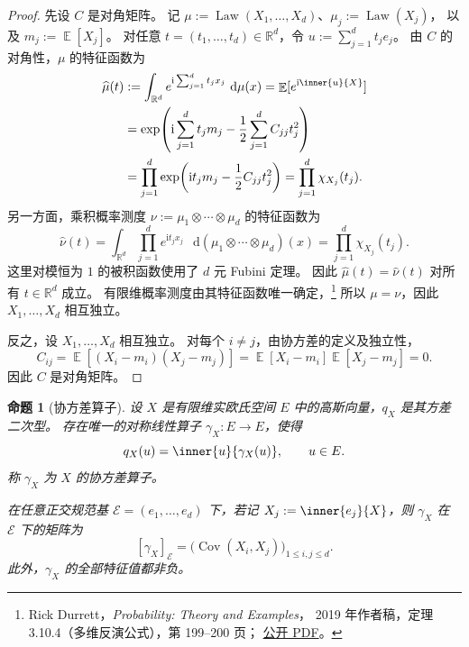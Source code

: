 \documentclass[UTF8,11pt,a4paper,oneside,fontset=fandol]{ctexrep}
\numberwithin{equation}{section}
\theoremstyle{plain}
\newtheorem{proposition}[theorem]{命题}
\theoremstyle{definition}
\theoremstyle{remark}
\newcommand{\R}{\mathbb{R}}
\DeclareMathOperator{\E}{\mathbb{E}}
\DeclareMathOperator{\Cov}{Cov}
\DeclareMathOperator{\Law}{Law}
\newcommand{\dd}{\mathop{}\!\mathrm{d}}
\begin{document}
\begin{proof}
先设 $C$ 是对角矩阵。
记 $\mu:=\Law(X_1,\ldots,X_d)$、$\mu_j:=\Law(X_j)$，
以及 $m_j:=\E[X_j]$。
对任意 $t=(t_1,\ldots,t_d)\in\R^d$，令 $u:=\sum_{j=1}^{d}t_je_j$。
由 $C$ 的对角性，$\mu$ 的特征函数为 
\begin{align*}
  \widehat\mu(t)
  &:=\int_{\R^d}e^{\mathrm{i}\sum_{j=1}^{d}t_jx_j}\,\dd\mu(x)
    =\E[e^{\mathrm{i}\inner{u}{X}}]\\
  &=\exp\!\left(
      \mathrm{i}\sum_{j=1}^{d}t_jm_j
      -\frac12\sum_{j=1}^{d}C_{jj}t_j^2
    \right)\\
  &=\prod_{j=1}^{d}
      \exp\!\left(\mathrm{i}t_jm_j-\frac12C_{jj}t_j^2\right)
    =\prod_{j=1}^{d}\chi_{X_j}(t_j).
\end{align*}
另一方面，乘积概率测度 $\nu:=\mu_1\otimes\cdots\otimes\mu_d$
的特征函数为
\[
  \widehat\nu(t)
  =\int_{\R^d}\prod_{j=1}^{d}e^{\mathrm{i}t_jx_j}\,
      \dd(\mu_1\otimes\cdots\otimes\mu_d)(x)
  =\prod_{j=1}^{d}\chi_{X_j}(t_j).
\]
这里对模恒为 $1$ 的被积函数使用了 $d$ 元 Fubini 定理。
因此 $\widehat\mu(t)=\widehat\nu(t)$ 对所有 $t\in\R^d$ 成立。
有限维概率测度由其特征函数唯一确定，\footnote{%
Rick Durrett，\emph{Probability: Theory and Examples}，
2019 年作者稿，定理 3.10.4（多维反演公式），第 199--200 页；
\href{https://sites.math.duke.edu/~rtd/PTE/PTE5_011119.pdf}{公开 PDF}。}
所以 $\mu=\nu$，因此 $X_1,\ldots,X_d$ 相互独立。

反之，设 $X_1,\ldots,X_d$ 相互独立。
对每个 $i\ne j$，由协方差的定义及独立性，
\[
  C_{ij}
  =\E\!\left[(X_i-m_i)(X_j-m_j)\right]
  =\E[X_i-m_i]\E[X_j-m_j]
  =0.
\]
因此 $C$ 是对角矩阵。
\end{proof}

\begin{proposition}[协方差算子]
\label{prop:gaussian-covariance-operator}
设 $X$ 是有限维实欧氏空间 $E$ 中的高斯向量，$q_X$ 是其方差二次型。
存在唯一的对称线性算子 $\gamma_X:E\to E$，使得
\begin{equation}
  \label{eq:gaussian-covariance-operator}
  q_X(u)=\inner{u}{\gamma_X(u)},\qquad u\in E.
\end{equation}
称 $\gamma_X$ 为 $X$ 的协方差算子。

在任意正交规范基 $\mathcal{E}=(e_1,\ldots,e_d)$ 下，若记
$X_j:=\inner{e_j}{X}$，则 $\gamma_X$ 在 $\mathcal{E}$ 下的矩阵为
\[
  [\gamma_X]_{\mathcal{E}}
  =\bigl(\Cov(X_i,X_j)\bigr)_{1\le i,j\le d}.
\]
此外，$\gamma_X$ 的全部特征值都非负。
\end{proposition}
\end{document}

